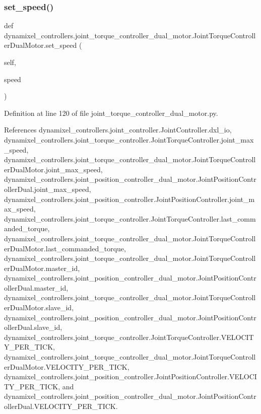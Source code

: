 \subsubsection{\texorpdfstring{set\+\_\+speed()}{set\_speed()}}
{\footnotesize\ttfamily def dynamixel\+\_\+controllers.\+joint\+\_\+torque\+\_\+controller\+\_\+dual\+\_\+motor.\+Joint\+Torque\+Controller\+Dual\+Motor.\+set\+\_\+speed (\begin{DoxyParamCaption}\item[{}]{self,  }\item[{}]{speed }\end{DoxyParamCaption})}



Definition at line 120 of file joint\+\_\+torque\+\_\+controller\+\_\+dual\+\_\+motor.\+py.



References dynamixel\+\_\+controllers.\+joint\+\_\+controller.\+Joint\+Controller.\+dxl\+\_\+io, dynamixel\+\_\+controllers.\+joint\+\_\+torque\+\_\+controller.\+Joint\+Torque\+Controller.\+joint\+\_\+max\+\_\+speed, dynamixel\+\_\+controllers.\+joint\+\_\+torque\+\_\+controller\+\_\+dual\+\_\+motor.\+Joint\+Torque\+Controller\+Dual\+Motor.\+joint\+\_\+max\+\_\+speed, dynamixel\+\_\+controllers.\+joint\+\_\+position\+\_\+controller\+\_\+dual\+\_\+motor.\+Joint\+Position\+Controller\+Dual.\+joint\+\_\+max\+\_\+speed, dynamixel\+\_\+controllers.\+joint\+\_\+position\+\_\+controller.\+Joint\+Position\+Controller.\+joint\+\_\+max\+\_\+speed, dynamixel\+\_\+controllers.\+joint\+\_\+torque\+\_\+controller.\+Joint\+Torque\+Controller.\+last\+\_\+commanded\+\_\+torque, dynamixel\+\_\+controllers.\+joint\+\_\+torque\+\_\+controller\+\_\+dual\+\_\+motor.\+Joint\+Torque\+Controller\+Dual\+Motor.\+last\+\_\+commanded\+\_\+torque, dynamixel\+\_\+controllers.\+joint\+\_\+torque\+\_\+controller\+\_\+dual\+\_\+motor.\+Joint\+Torque\+Controller\+Dual\+Motor.\+master\+\_\+id, dynamixel\+\_\+controllers.\+joint\+\_\+position\+\_\+controller\+\_\+dual\+\_\+motor.\+Joint\+Position\+Controller\+Dual.\+master\+\_\+id, dynamixel\+\_\+controllers.\+joint\+\_\+torque\+\_\+controller\+\_\+dual\+\_\+motor.\+Joint\+Torque\+Controller\+Dual\+Motor.\+slave\+\_\+id, dynamixel\+\_\+controllers.\+joint\+\_\+position\+\_\+controller\+\_\+dual\+\_\+motor.\+Joint\+Position\+Controller\+Dual.\+slave\+\_\+id, dynamixel\+\_\+controllers.\+joint\+\_\+torque\+\_\+controller.\+Joint\+Torque\+Controller.\+V\+E\+L\+O\+C\+I\+T\+Y\+\_\+\+P\+E\+R\+\_\+\+T\+I\+CK, dynamixel\+\_\+controllers.\+joint\+\_\+torque\+\_\+controller\+\_\+dual\+\_\+motor.\+Joint\+Torque\+Controller\+Dual\+Motor.\+V\+E\+L\+O\+C\+I\+T\+Y\+\_\+\+P\+E\+R\+\_\+\+T\+I\+CK, dynamixel\+\_\+controllers.\+joint\+\_\+position\+\_\+controller.\+Joint\+Position\+Controller.\+V\+E\+L\+O\+C\+I\+T\+Y\+\_\+\+P\+E\+R\+\_\+\+T\+I\+CK, and dynamixel\+\_\+controllers.\+joint\+\_\+position\+\_\+controller\+\_\+dual\+\_\+motor.\+Joint\+Position\+Controller\+Dual.\+V\+E\+L\+O\+C\+I\+T\+Y\+\_\+\+P\+E\+R\+\_\+\+T\+I\+CK.


